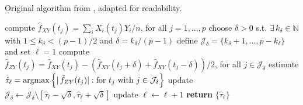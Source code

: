 \begin{tcolorbox}[standard jigsaw, opacityback=0]

\begin{algorithm}[H]
\caption{Original algorithm from \cite{Kneip2020}, adapted for readability.}
\label{algorithm:1}
\begin{algorithmic}[1]
  \State compute $\hat{f}_{XY}(t_j) = \sum_i X_i(t_j) Y_i / n$, for all $j=1,\dots,p$
  \State choose $\delta > 0$ s.t. $\exists \, k_{\delta} \in \mathbb{N}$ with $1 \leq
  k_{\delta} < (p - 1)/2$ and $\delta = k_{\delta} / (p-1)$
  \State define $\mathcal{J}_{\delta} = \{k_{\delta} + 1, \dots, p - k_{\delta}\}$ and
  set $\ell = 1$
  \State compute $\hat{f}_{ZY}(t_j) = \hat{f}_{XY}(t_j) - (\hat{f}_{XY}(t_j + \delta) +
  \hat{f}_{XY}(t_j - \delta)) / 2$, for all $j \in \mathcal{J}_{\delta}$
  \State estimate $\hat{\tau}_{\ell} = \operatorname*{argmax} \left\{|\,\hat{f}_{ZY}(t_j)| : \text{for }
      t_j \text{ with } j \in \mathcal{J}_{\delta}\right\}$
    \State update $\mathcal{J}_{\delta} \leftarrow \mathcal{J}_{\delta} \setminus
    [\hat{\tau}_{\ell} - \sqrt{\delta}, \hat{\tau}_{\ell} + \sqrt{\delta}]$
    \State update $\ell \leftarrow \ell + 1$
  \EndWhile
  \State \textbf{return} $\{\hat{\tau}_{\ell}\}$
\end{algorithmic}
\end{algorithm}

\end{tcolorbox}

